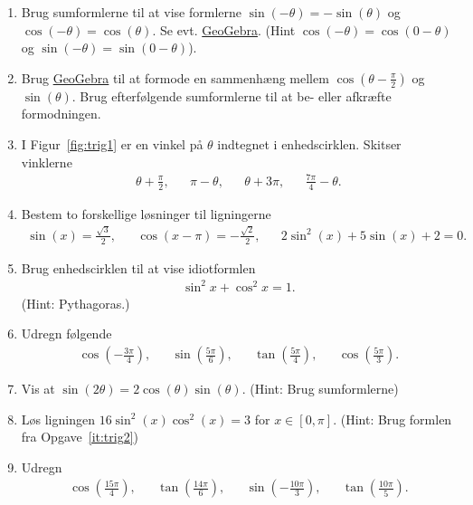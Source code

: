 \begin{enumerate}
	\item Brug sumformlerne til at vise formlerne $\sin(-\theta)=-\sin(\theta) $ og $\cos(-\theta)=\cos(\theta) $. Se evt. \href{https://www.geogebra.org/m/e2vTM4Ut}{GeoGebra}. (Hint $\cos(-\theta)=\cos(0-\theta)$ og $\sin(-\theta)=\sin(0-\theta)$).
	
	\item Brug \href{https://www.geogebra.org/m/e2vTM4Ut}{GeoGebra} til at formode en sammenhæng mellem $\cos(\theta-\frac{\pi}{2})$ og $\sin(\theta)$. Brug efterfølgende sumformlerne til at be- eller afkræfte formodningen.
	  
	  	\item \label{it:trig1} I Figur~\ref{fig:trig1} er en vinkel på $\theta$ indtegnet i enhedscirklen. Skitser vinklerne
	  \begin{align*}
	  \theta+ \frac{\pi}{2},&& \pi-\theta,&& \theta +3\pi,&& \frac{7\pi}{4}-\theta.
	  \end{align*}
	  
	
	 
	 \item Bestem to forskellige løsninger til ligningerne 
	 \begin{align*}
	 \sin(x)=\frac{\sqrt{3}}{2},&& \cos(x-\pi)=-\frac{\sqrt{2}}{2},&& 2\sin^2(x)+5\sin(x)+2=0.
	 \end{align*}

	\item Brug enhedscirklen til at vise idiotformlen
	\begin{align*}
	\sin^2x+\cos^2x=1.
	\end{align*}
	(Hint: Pythagoras.)

	\item Udregn følgende
	\begin{align*}
	\cos(-\frac{3\pi}{4}),&& \sin(\frac{5\pi}{6}),&&\tan(\frac{5\pi}{4}),&& \cos(\frac{5\pi}{3}).
	\end{align*}
	
	\item\label{it:trig2} Vis at $\sin(2\theta)=2\cos(\theta)\sin(\theta)$. (Hint: Brug sumformlerne)

	\item Løs ligningen $16\sin^2(x)\cos^2(x)=3$ for $x\in [0,\pi]$. (Hint: Brug formlen fra Opgave~\ref{it:trig2})
	
	\item Udregn
	\begin{align*}
	\cos(\frac{15\pi}{4}),&& \tan(\frac{14\pi}{6}),&& \sin(-\frac{10\pi}{3}),&& \tan(\frac{10 \pi}{5}).
	\end{align*}
	

\end{enumerate}
